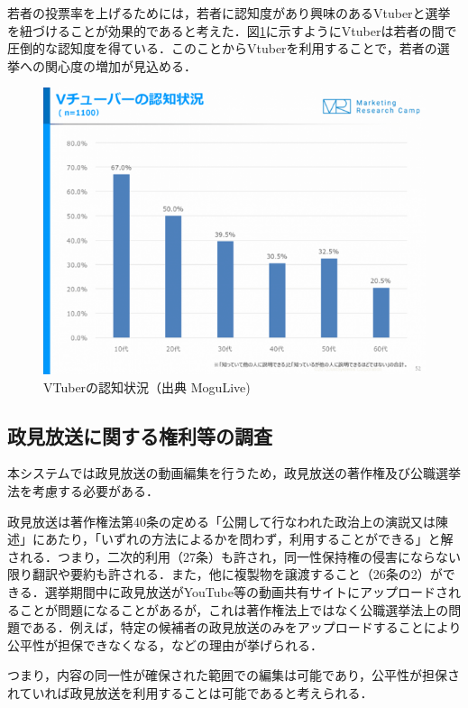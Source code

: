 \documentclass[a4paper,12pt]{jsarticle}
\begin{document}
若者の投票率を上げるためには，若者に認知度があり興味のあるVtuberと選挙を紐づけることが効果的であると考えた．図\ref{fig:vtuber}に示すようにVtuberは若者の間で圧倒的な認知度を得ている．このことからVtuberを利用することで，若者の選挙への関心度の増加が見込める．

\begin{figure}[H]
	\begin{center}
		\includegraphics[width=12.0cm]{fig/vtube.png}
		\caption{VTuberの認知状況（出典 MoguLive\cite{vtuber})}
		\label{fig:vtuber}
	\end{center}
\end{figure}

\subsection{政見放送に関する権利等の調査}

本システムでは政見放送の動画編集を行うため，政見放送の著作権及び公職選挙法を考慮する必要がある．

政見放送は著作権法第40条の定める「公開して行なわれた政治上の演説又は陳述」にあたり，「いずれの方法によるかを問わず，利用することができる」と解される．つまり，二次的利用（27条）も許され，同一性保持権の侵害にならない限り翻訳や要約も許される．また，他に複製物を譲渡すること（26条の2）ができる\cite{law}．選挙期間中に政見放送がYouTube等の動画共有サイトにアップロードされることが問題になることがあるが，これは著作権法上ではなく公職選挙法上の問題である．例えば，特定の候補者の政見放送のみをアップロードすることにより公平性が担保できなくなる，などの理由が挙げられる\cite{wiki}．

つまり，内容の同一性が確保された範囲での編集は可能であり，公平性が担保されていれば政見放送を利用することは可能であると考えられる．
\end{document}
